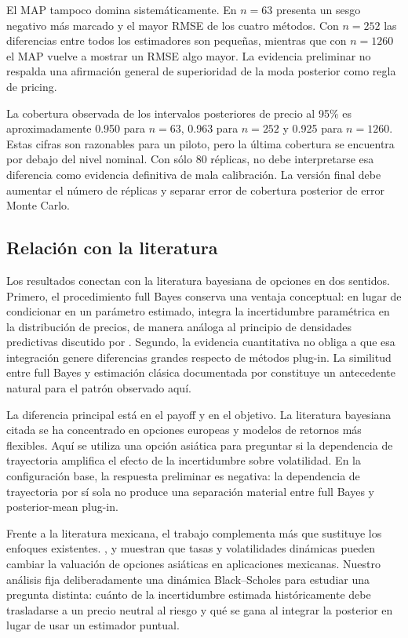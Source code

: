 \documentclass[12pt,letterpaper]{article}
\begin{document}
El MAP tampoco domina sistemáticamente. En $n=63$ presenta un sesgo negativo más marcado y el mayor RMSE de los cuatro métodos. Con $n=252$ las diferencias entre todos los estimadores son pequeñas, mientras que con $n=1260$ el MAP vuelve a mostrar un RMSE algo mayor. La evidencia preliminar no respalda una afirmación general de superioridad de la moda posterior como regla de pricing.

La cobertura observada de los intervalos posteriores de precio al 95\% es aproximadamente 0.950 para $n=63$, 0.963 para $n=252$ y 0.925 para $n=1260$. Estas cifras son razonables para un piloto, pero la última cobertura se encuentra por debajo del nivel nominal. Con sólo 80 réplicas, no debe interpretarse esa diferencia como evidencia definitiva de mala calibración. La versión final debe aumentar el número de réplicas y separar error de cobertura posterior de error Monte Carlo.

\subsection{Relación con la literatura}

Los resultados conectan con la literatura bayesiana de opciones en dos sentidos. Primero, el procedimiento full Bayes conserva una ventaja conceptual: en lugar de condicionar en un parámetro estimado, integra la incertidumbre paramétrica en la distribución de precios, de manera análoga al principio de densidades predictivas discutido por \citet{romboutsstentoft2014}. Segundo, la evidencia cuantitativa no obliga a que esa integración genere diferencias grandes respecto de métodos plug-in. La similitud entre full Bayes y estimación clásica documentada por \citet{romboutsstentoft2014} constituye un antecedente natural para el patrón observado aquí.

La diferencia principal está en el payoff y en el objetivo. La literatura bayesiana citada se ha concentrado en opciones europeas y modelos de retornos más flexibles. Aquí se utiliza una opción asiática para preguntar si la dependencia de trayectoria amplifica el efecto de la incertidumbre sobre volatilidad. En la configuración base, la respuesta preliminar es negativa: la dependencia de trayectoria por sí sola no produce una separación material entre full Bayes y posterior-mean plug-in.

Frente a la literatura mexicana, el trabajo complementa más que sustituye los enfoques existentes. \citet{ortiz2016}, \citet{matias2019} y \citet{ortizjimenez2026} muestran que tasas y volatilidades dinámicas pueden cambiar la valuación de opciones asiáticas en aplicaciones mexicanas. Nuestro análisis fija deliberadamente una dinámica Black--Scholes para estudiar una pregunta distinta: cuánto de la incertidumbre estimada históricamente debe trasladarse a un precio neutral al riesgo y qué se gana al integrar la posterior en lugar de usar un estimador puntual.
\end{document}
